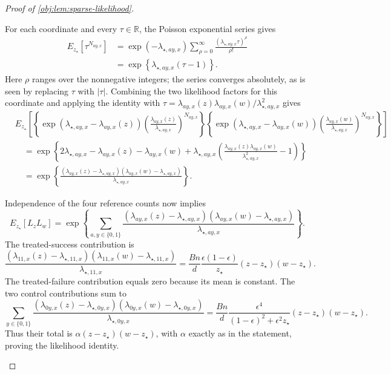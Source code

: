 \begin{proof}[Proof of \cref{obj:lem:sparse-likelihood}]
\begin{enumerate}
For each coordinate and every \(\tau\in\mathbb R\), the Poisson exponential series gives
\[
\begin{aligned}
E_{z_\star}\!\left[\tau^{N_{ay,x}}\right]
&=\exp(-\lambda_{\star,ay,x})
\sum_{\rho=0}^{\infty}
\frac{(\lambda_{\star,ay,x}\tau)^\rho}{\rho!}\\
&=\exp\!\left\{\lambda_{\star,ay,x}(\tau-1)\right\}.
\end{aligned}
\]
Here \(\rho\) ranges over the nonnegative integers; the series converges absolutely, as is seen by replacing \(\tau\) with \(|\tau|\). Combining the two likelihood factors for this coordinate and applying the identity with
\(\tau=\lambda_{ay,x}(z)\lambda_{ay,x}(w)/\lambda_{\star,ay,x}^2\) gives
\[
\begin{aligned}
&E_{z_\star}\!\left[
\left\{\exp(\lambda_{\star,ay,x}-\lambda_{ay,x}(z))
\left(\frac{\lambda_{ay,x}(z)}{\lambda_{\star,ay,x}}\right)^{N_{ay,x}}\right\}
\left\{\exp(\lambda_{\star,ay,x}-\lambda_{ay,x}(w))
\left(\frac{\lambda_{ay,x}(w)}{\lambda_{\star,ay,x}}\right)^{N_{ay,x}}\right\}
\right]\\
&\quad=
\exp\!\left\{
2\lambda_{\star,ay,x}-\lambda_{ay,x}(z)-\lambda_{ay,x}(w)
+\lambda_{\star,ay,x}
\left(\frac{\lambda_{ay,x}(z)\lambda_{ay,x}(w)}
{\lambda_{\star,ay,x}^2}-1\right)
\right\}\\
&\quad=
\exp\!\left\{
\frac{(\lambda_{ay,x}(z)-\lambda_{\star,ay,x})
(\lambda_{ay,x}(w)-\lambda_{\star,ay,x})}
{\lambda_{\star,ay,x}}
\right\}.
\end{aligned}
\]

Independence of the four reference counts now implies
\[
E_{z_\star}[L_zL_w]
=\exp\!\left\{
\sum_{a,y\in\{0,1\}}
\frac{(\lambda_{ay,x}(z)-\lambda_{\star,ay,x})
(\lambda_{ay,x}(w)-\lambda_{\star,ay,x})}
{\lambda_{\star,ay,x}}
\right\}.
\]
The treated-success contribution is
\[
\frac{(\lambda_{11,x}(z)-\lambda_{\star,11,x})
(\lambda_{11,x}(w)-\lambda_{\star,11,x})}
{\lambda_{\star,11,x}}
=
\frac{Bn}{d}\frac{\epsilon(1-\epsilon)}{z_\star}
(z-z_\star)(w-z_\star).
\]
The treated-failure contribution equals zero because its mean is constant. The two control contributions sum to
\[
\sum_{y\in\{0,1\}}
\frac{(\lambda_{0y,x}(z)-\lambda_{\star,0y,x})
(\lambda_{0y,x}(w)-\lambda_{\star,0y,x})}
{\lambda_{\star,0y,x}}
=
\frac{Bn}{d}
\frac{\epsilon^4}{(1-\epsilon)^2+\epsilon^2z_\star}
(z-z_\star)(w-z_\star).
\]
Thus their total is \(\alpha(z-z_\star)(w-z_\star)\), with \(\alpha\) exactly as in the statement, proving the likelihood identity.


\end{enumerate}
\end{proof}
